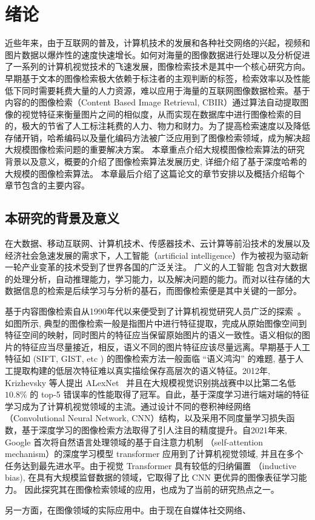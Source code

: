 
\chapter{绪论}
近些年来，由于互联网的普及，计算机技术的发展和各种社交网络的兴起，视频和图片数据以爆炸性的速度快速增长。如何对海量的图像数据进行处理以及分析促进了一系列的计算机视觉技术的飞速发展，图像检索技术是其中一个核心研究方向。早期基于文本的图像检索极大依赖于标注者的主观判断的标签，检索效率以及性能低下同时需要耗费大量的人力资源，难以应用于海量的互联网图像数据检索。基于内容的的图像检索（Content Based Image Retrieval, CBIR）通过算法自动提取图像的视觉特征来衡量图片之间的相似度，从而实现在数据库中进行图像检索的目的，极大的节省了人工标注耗费的人力、物力和财力。为了提高检索速度以及降低存储开销，哈希编码以及量化编码方法被广泛应用到了图像检索领域，成为解决超大规模图像检索问题的重要解决方案。 本章重点介绍大规模图像检索算法的研究背景以及意义，概要的介绍了图像检索算法发展历史, 详细介绍了基于深度哈希的大规模的图像检索算法。 本章最后介绍了这篇论文的章节安排以及概括介绍每个章节包含的主要内容。
\section{本研究的背景及意义}
在大数据、移动互联网、计算机技术、传感器技术、云计算等前沿技术的发展以及经济社会急速发展的需求下，人工智能（artificial intelligence）作为被视为驱动新一轮产业变革的技术受到了世界各国的广泛关注。 广义的人工智能\cite{russell2010artificial} 包含对大数据的处理分析，自动推理能力，学习能力，以及解决问题的能力。而对以往存储的大数据信息的检索是后续学习与分析的基石，而图像检索便是其中关键的一部分。 \par
基于内容图像检索自从1990年代以来便受到了计算机视觉研究人员广泛的探索~\cite{}。如图所示, 典型的图像检索一般是指图片中进行特征提取，完成从原始图像空间到特征空间的映射，同时图片的特征应当保留原始图片的语义一致性。语义相似的图片的特征应当尽量接近，相反，语义不同的图片特征应该尽量远离。早期基于人工特征如 (SIFT, GIST, etc ) 的图像检索方法一般面临 ``语义鸿沟'' \cite*{bibid}的难题, 基于人工提取构建的低层次特征难以真实描绘保存高层次的语义特征。2012年, Krizhevsky 等人提出 ALexNet~\cite{} 并且在大规模视觉识别挑战赛中以比第二名低 $10.8\%$ 的 top-5 错误率的性能取得了冠军。自此，基于深度学习进行端对端的特征学习成为了计算机视觉领域的主流。通过设计不同的卷积神经网络（Convolutional Neural Network, CNN）结构，以及采用不同度量学习损失函数，基于深度学习的图像检索方法取得了引人注目的精度提升。自2021年来, Google 首次将自然语言处理领域的基于自注意力机制 （self-attention mechanism）的深度学习模型 transformer 应用到了计算机视觉领域, 并且在多个任务达到最先进水平。由于视觉 Transformer 具有较低的归纳偏置 （inductive bias), 在具有大规模监督数据的领域，它取得了比 CNN 更优异的图像表征学习能力。 因此探究其在图像检索领域的应用，也成为了当前的研究热点之一。  \par
另一方面，在图像领域的实际应用中。由于现在自媒体社交网络、

